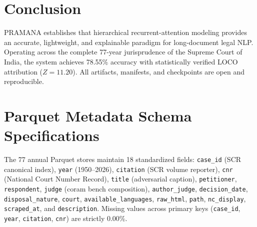 \documentclass[journal,10pt,twocolumn]{IEEEtran}
\begin{document}
\section{Conclusion}
PRAMANA establishes that hierarchical recurrent-attention modeling provides an accurate, lightweight, and explainable paradigm for long-document legal NLP. Operating across the complete 77-year jurisprudence of the Supreme Court of India, the system achieves 78.55\% accuracy with statistically verified LOCO attribution ($Z = 11.20$). All artifacts, manifests, and checkpoints are open and reproducible.

\appendices
\section{Parquet Metadata Schema Specifications}
The 77 annual Parquet stores maintain 18 standardized fields: \texttt{case\_id} (SCR canonical index), \texttt{year} (1950--2026), \texttt{citation} (SCR volume reporter), \texttt{cnr} (National Court Number Record), \texttt{title} (adversarial caption), \texttt{petitioner}, \texttt{respondent}, \texttt{judge} (coram bench composition), \texttt{author\_judge}, \texttt{decision\_date}, \texttt{disposal\_nature}, \texttt{court}, \texttt{available\_languages}, \texttt{raw\_html}, \texttt{path}, \texttt{nc\_display}, \texttt{scraped\_at}, and \texttt{description}. Missing values across primary keys (\texttt{case\_id}, \texttt{year}, \texttt{citation}, \texttt{cnr}) are strictly 0.00\%.
\end{document}
